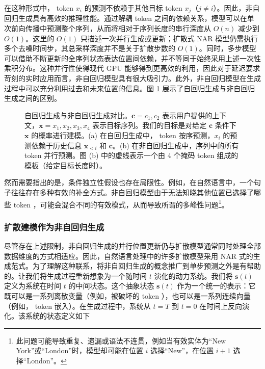 在这种形式中， token $x_i$ 的预测不依赖于其他目标 token $x_{j}$（$j \neq i$）。因此，非自回归生成具有高效的推理性能。通过解耦 token 之间的依赖关系，模型可以在单次前向传播中预测整个序列，从而将相对于序列长度的串行深度从 $O(n)$ 减少到 $O(1)$。这里的 $O(1)$ 只描述一次并行生成或更新；扩散式 NAR 模型仍需执行多个去噪时间步，其总采样深度并不是关于扩散步数的 $O(1)$。同时，多步模型可以借助不断更新的全序列状态表达位置间依赖，并不等同于始终采用上述一次性乘积分布。这种并行性使得现代 GPU 能够得到更高效的利用，因此对于延迟要求苛刻的实时应用而言，非自回归模型具有很大吸引力。此外，非自回归模型在生成过程中可以充分利用过去和未来位置的信息。图 \ref{fig:ar-vs-nar-generation} 展示了自回归生成与非自回归生成之间的区别。

\begin{figure}[!t]
\centering
{}
\caption{自回归生成与非自回归生成对比。$\mathbf{c} = {c_1,c_2}$ 表示用户提供的上下文，$\mathbf{x}={x_1,x_2,x_3,x_4}$ 表示目标序列。我们的目标是对给定 $\mathbf{c}$ 条件下 $\mathbf{x}$ 的概率进行建模。(a) 在自回归生成中， token 按序预测，$x_i$ 的预测依赖于历史信息 $\mathbf{x}_{<i}$ 和 $\mathbf{c}$。(b) 在非自回归生成中，序列中的所有 token 并行预测。图 (b) 中的虚线表示一个由 4 个掩码 token 组成的模板（给定目标长度时）。}
\label{fig:ar-vs-nar-generation}
\end{figure}

然而需要指出的是，条件独立性假设也存在局限性。例如，在自然语言中，一个句子往往存在多种有效的补全方式。非自回归模型由于无法知晓其他位置已选择了哪些 token ，可能会混合不同的有效模式，从而导致所谓的多峰性问题\footnote{此问题可能导致重复、遗漏或语法不连贯，例如当有效实体为“New York”或“London”时，模型却可能在位置 $i$ 选择“New”，在位置 $i+1$ 选择“London”。}。

\subsubsection{扩散建模作为非自回归生成}

尽管存在上述限制，非自回归生成的并行位置更新仍与扩散模型通常同时处理全部数据维度的方式相适应。因此，自然语言处理中的许多扩散模型采用 NAR 式的生成范式。为了理解这种联系，将非自回归生成的概念推广到单步预测之外是有帮助的。让我们将生成过程重新想象为一个随时间 $t$ 演化的动力系统。我们将 $\mathbf{s}(t)$ 定义为系统在时间 $t$ 的中间状态。这个抽象状态 $\mathbf{s}(t)$ 作为一个统一的表示：它既可以是一系列离散变量（例如，被破坏的 token ），也可以是一系列连续向量（例如， token 嵌入）。在生成过程中，系统从 $t=T$ 到 $t=0$ 在时间上反向演化。该系统的状态定义如下

